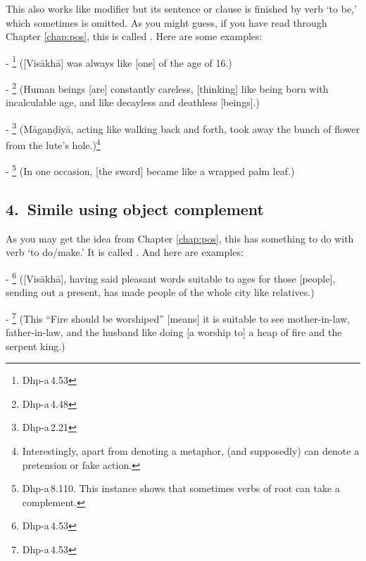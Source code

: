 This also works like modifier but its sentence or clause is finished by verb `to be,' which sometimes is omitted. As you might guess, if you have read through Chapter \ref{chap:pos}, this is called . Here are some examples:\par
- \footnote{Dhp-a\,4.53} ([Vis\=akh\=a] was always like [one] of the age of 16.)\par
- \footnote{Dhp-a\,4.48} (Human beings [are] constantly careless, [thinking] like being born with incalculable age, and like decayless and deathless [beings].)\par
- \footnote{Dhp-a\,2.21} (M\=aga\d n\d diy\=a, acting like walking back and forth, took away the bunch of flower from the lute's hole.)\footnote{Interestingly, apart from denoting a metaphor,  (and  supposedly) can denote a pretension or fake action.}\par
- \footnote{Dhp-a\,8.110. This instance shows that sometimes verbs of root  can take a complement.} (In one occasion, [the sword] became like a wrapped palm leaf.)\par

\subsection*{4.\ Simile using object complement}

As you may get the idea from Chapter \ref{chap:pos}, this has something to do with verb `to do/make.' It is called . And here are examples:\par
- \footnote{Dhp-a\,4.53} ([Vis\=akh\=a], having said pleasant words suitable to ages for those [people], sending out a present, has made people of the whole city like relatives.)\par
- \footnote{Dhp-a\,4.53} (This ``Fire should be worshiped'' [means] it is suitable to see mother-in-law, father-in-law, and the husband like doing [a worship to] a heap of fire and the serpent king.)\par

